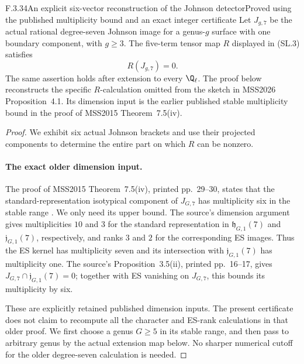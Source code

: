 \begin{result}{F.3.34}{An explicit six-vector reconstruction of the Johnson detector}{Proved using the published multiplicity bound and an exact integer certificate}
Let $J_{g,7}$ be the actual rational degree-seven Johnson image
for a genus-$g$ surface with one boundary component, with $g\geq3$.
The five-term tensor map $R$ displayed in (SL.3) satisfies
\[
                              R(J_{g,7})=0.                \tag{RV.1}
\]
The same assertion holds after extension to every $\Q_\ell$.
The proof below reconstructs the specific $R$-calculation omitted
from the sketch in MSS2026 Proposition~4.1. Its dimension input
is the earlier published stable multiplicity bound in the proof
of MSS2015 Theorem~7.5(iv).
\end{result}
\begin{proof}
We exhibit six actual Johnson brackets and use their projected
components to determine the entire part on which $R$ can be nonzero.

\paragraph{The exact older dimension input.}
The proof of MSS2015 Theorem~7.5(iv), printed pp.~29--30,
states that the standard-representation isotypical component
of $J_{G,7}$ has multiplicity six in the stable range
\cite{AuditMoritaSakasaiSuzuki2015v2}. We only need its upper
bound. The source's dimension argument gives multiplicities
$10$ and $3$ for the standard representation in
$\mathfrak h_{G,1}(7)$ and $\mathfrak j_{G,1}(7)$,
respectively, and ranks $3$ and $2$ for the corresponding
ES images. Thus the ES kernel has multiplicity seven and
its intersection with $\mathfrak j_{G,1}(7)$ has multiplicity
one. The source's Proposition~3.5(ii), printed pp.~16--17,
gives $J_{G,7}\cap\mathfrak j_{G,1}(7)=0$; together with
ES vanishing on $J_{G,7}$, this bounds its multiplicity by six.

These are explicitly retained published dimension inputs.
The present certificate does not claim to recompute all
the character and ES-rank calculations in that older proof.
We first choose a genus $G\geq5$ in its stable range, and
then pass to arbitrary genus by the actual extension map
below. No sharper numerical cutoff for the older
degree-seven calculation is needed.


\end{proof}
